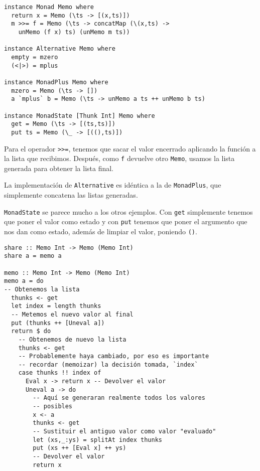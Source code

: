 \documentclass[class=article, crop=false]{standalone}
\begin{document}
\begin{verbatim}
instance Monad Memo where
  return x = Memo (\ts -> [(x,ts)])
  m >>= f = Memo (\ts -> concatMap (\(x,ts) ->
    unMemo (f x) ts) (unMemo m ts))

instance Alternative Memo where
  empty = mzero
  (<|>) = mplus

instance MonadPlus Memo where
  mzero = Memo (\ts -> [])
  a `mplus` b = Memo (\ts -> unMemo a ts ++ unMemo b ts)

instance MonadState [Thunk Int] Memo where
  get = Memo (\ts -> [(ts,ts)])
  put ts = Memo (\_ -> [((),ts)])
\end{verbatim}

Para el operador \verb`>>=`, tenemos que sacar el valor encerrado aplicando la función a la
lista que recibimos. Después, como \verb`f` devuelve otro \verb`Memo`, usamos la lista
generada para obtener la lista final.

La implementación de \verb`Alternative` es idéntica a la de \verb`MonadPlus`, que simplemente
concatena las listas generadas.

\verb`MonadState` se parece mucho a los otros ejemplos. Con \verb`get` simplemente tenemos
que poner el valor como estado y con \verb`put` tenemos que poner el argumento que nos dan
como estado, además de limpiar el valor, poniendo \verb`()`.

\begin{verbatim}
share :: Memo Int -> Memo (Memo Int)
share a = memo a

memo :: Memo Int -> Memo (Memo Int)
memo a = do
-- Obtenemos la lista
  thunks <- get
  let index = length thunks
  -- Metemos el nuevo valor al final
  put (thunks ++ [Uneval a])
  return $ do
    -- Obtenemos de nuevo la lista
    thunks <- get
    -- Probablemente haya cambiado, por eso es importante
    -- recordar (memoizar) la decisión tomada, `index`
    case thunks !! index of
      Eval x -> return x -- Devolver el valor
      Uneval a -> do
        -- Aquí se generaran realmente todos los valores
        -- posibles
        x <- a
        thunks <- get
        -- Sustituir el antiguo valor como valor "evaluado"
        let (xs,_:ys) = splitAt index thunks
        put (xs ++ [Eval x] ++ ys)
        -- Devolver el valor
        return x
\end{verbatim}
\end{document}
